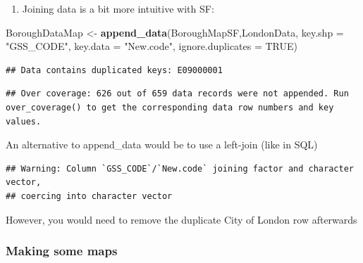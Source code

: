 \documentclass[]{book}
\newenvironment{Shaded}{\begin{snugshade}}{\end{snugshade}}
\newcommand{\DataTypeTok}[1]{\textcolor[rgb]{0.13,0.29,0.53}{#1}}
\newcommand{\KeywordTok}[1]{\textcolor[rgb]{0.13,0.29,0.53}{\textbf{#1}}}
\newcommand{\NormalTok}[1]{#1}
\newcommand{\OperatorTok}[1]{\textcolor[rgb]{0.81,0.36,0.00}{\textbf{#1}}}
\newcommand{\OtherTok}[1]{\textcolor[rgb]{0.56,0.35,0.01}{#1}}
\newcommand{\StringTok}[1]{\textcolor[rgb]{0.31,0.60,0.02}{#1}}
\providecommand{\tightlist}{%
  \setlength{\itemsep}{0pt}\setlength{\parskip}{0pt}}
\begin{document}
\begin{enumerate}
\def\labelenumi{\arabic{enumi}.}
\setcounter{enumi}{9}
\tightlist
\item
  Joining data is a bit more intuitive with SF:
\end{enumerate}

\begin{Shaded}
\begin{Highlighting}[]
\NormalTok{BoroughDataMap <-}\StringTok{ }\KeywordTok{append_data}\NormalTok{(BoroughMapSF,LondonData, }\DataTypeTok{key.shp =} \StringTok{"GSS_CODE"}\NormalTok{, }\DataTypeTok{key.data =} \StringTok{"New.code"}\NormalTok{, }\DataTypeTok{ignore.duplicates =} \OtherTok{TRUE}\NormalTok{)}
\end{Highlighting}
\end{Shaded}

\begin{verbatim}
## Data contains duplicated keys: E09000001
\end{verbatim}

\begin{verbatim}
## Over coverage: 626 out of 659 data records were not appended. Run over_coverage() to get the corresponding data row numbers and key values.
\end{verbatim}

An alternative to append\_data would be to use a left-join (like in SQL)

\begin{Shaded}
\end{Shaded}

\begin{verbatim}
## Warning: Column `GSS_CODE`/`New.code` joining factor and character vector,
## coercing into character vector
\end{verbatim}

However, you would need to remove the duplicate City of London row afterwards

\hypertarget{making-some-maps}{%
\subsubsection{Making some maps}\label{making-some-maps}}
\end{document}
